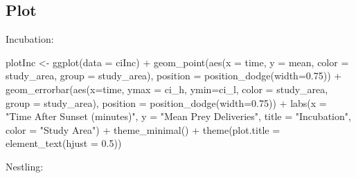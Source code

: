\documentclass[
]{article}
\newenvironment{Shaded}{\begin{snugshade}}{\end{snugshade}}
\newcommand{\AttributeTok}[1]{\textcolor[rgb]{0.77,0.63,0.00}{#1}}
\newcommand{\FloatTok}[1]{\textcolor[rgb]{0.00,0.00,0.81}{#1}}
\newcommand{\FunctionTok}[1]{\textcolor[rgb]{0.00,0.00,0.00}{#1}}
\newcommand{\NormalTok}[1]{#1}
\newcommand{\OtherTok}[1]{\textcolor[rgb]{0.56,0.35,0.01}{#1}}
\newcommand{\SpecialCharTok}[1]{\textcolor[rgb]{0.00,0.00,0.00}{#1}}
\newcommand{\StringTok}[1]{\textcolor[rgb]{0.31,0.60,0.02}{#1}}
\begin{document}
\hypertarget{plot-1}{%
\subsection{Plot}\label{plot-1}}

Incubation:

\begin{Shaded}
\begin{Highlighting}[]
\NormalTok{plotInc }\OtherTok{\textless{}{-}} \FunctionTok{ggplot}\NormalTok{(}\AttributeTok{data =}\NormalTok{ ciInc) }\SpecialCharTok{+}
  \FunctionTok{geom\_point}\NormalTok{(}\FunctionTok{aes}\NormalTok{(}\AttributeTok{x =}\NormalTok{ time, }\AttributeTok{y =}\NormalTok{ mean, }\AttributeTok{color =}\NormalTok{ study\_area, }\AttributeTok{group =}\NormalTok{ study\_area),}
             \AttributeTok{position =} \FunctionTok{position\_dodge}\NormalTok{(}\AttributeTok{width=}\FloatTok{0.75}\NormalTok{)) }\SpecialCharTok{+}
  \FunctionTok{geom\_errorbar}\NormalTok{(}\FunctionTok{aes}\NormalTok{(}\AttributeTok{x=}\NormalTok{time, }\AttributeTok{ymax =}\NormalTok{ ci\_h, }\AttributeTok{ymin=}\NormalTok{ci\_l, }\AttributeTok{color =}\NormalTok{ study\_area, }
                    \AttributeTok{group =}\NormalTok{ study\_area),}
                \AttributeTok{position =} \FunctionTok{position\_dodge}\NormalTok{(}\AttributeTok{width=}\FloatTok{0.75}\NormalTok{)) }\SpecialCharTok{+}
  \FunctionTok{labs}\NormalTok{(}\AttributeTok{x =} \StringTok{"Time After Sunset (minutes)"}\NormalTok{, }\AttributeTok{y =} \StringTok{"Mean Prey Deliveries"}\NormalTok{, }
       \AttributeTok{title =} \StringTok{"Incubation"}\NormalTok{, }\AttributeTok{color =} \StringTok{"Study Area"}\NormalTok{) }\SpecialCharTok{+}
  \FunctionTok{theme\_minimal}\NormalTok{() }\SpecialCharTok{+}
  \FunctionTok{theme}\NormalTok{(}\AttributeTok{plot.title =} \FunctionTok{element\_text}\NormalTok{(}\AttributeTok{hjust =} \FloatTok{0.5}\NormalTok{))}
\end{Highlighting}
\end{Shaded}

Nestling:
\end{document}

